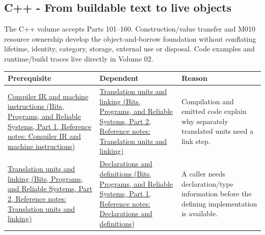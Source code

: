 \subsection{C++ - From buildable text to live objects}\label{appendix-4ad47bdd269a-c---from-buildable-text-to-live-objects}

\hypertarget{appendix-4ad47bdd269a-c---from-buildable-text-to-live-objects}{}

The C++ volume accepts Parts 101--160. Construction/value transfer and M010 resource ownership develop the object-and-borrow foundation without conflating lifetime, identity, category, storage, external use or disposal. Code examples and runtime/build traces live directly in {Volume 02}.

{\def\LTcaptype{none} %
\begin{longtable}[]{@{}
  >{\raggedright\arraybackslash}p{}
  >{\raggedright\arraybackslash}p{}
  >{\raggedright\arraybackslash}p{}@{}}
\toprule\noalign{}
\begin{minipage}[b]{\linewidth}\raggedright
Prerequisite
\end{minipage} & \begin{minipage}[b]{\linewidth}\raggedright
Dependent
\end{minipage} & \begin{minipage}[b]{\linewidth}\raggedright
Reason
\end{minipage} \\
\midrule\noalign{}
\endhead
\bottomrule\noalign{}
\endlastfoot
\href{../01-Bits-Programs-and-Reliable-Systems-P01/main.pdf\#nameddest=appendix-942ad41afb30}{Compiler IR and machine instructions (Bits, Programs, and Reliable Systems, Part 1, Reference notes: Compiler IR and machine instructions)} & \href{../01-Bits-Programs-and-Reliable-Systems-P02/main.pdf\#nameddest=appendix-806686359e1b}{Translation units and linking (Bits, Programs, and Reliable Systems, Part 2, Reference notes: Translation units and linking)} & Compilation and emitted code explain why separately translated units need a link step. \\
\href{../01-Bits-Programs-and-Reliable-Systems-P02/main.pdf\#nameddest=appendix-806686359e1b}{Translation units and linking (Bits, Programs, and Reliable Systems, Part 2, Reference notes: Translation units and linking)} & \href{../01-Bits-Programs-and-Reliable-Systems-P01/main.pdf\#nameddest=appendix-2e4d494c2d94}{Declarations and definitions (Bits, Programs, and Reliable Systems, Part 1, Reference notes: Declarations and definitions)} & A caller needs declaration/type information before the defining implementation is available. \\

\end{longtable}}
